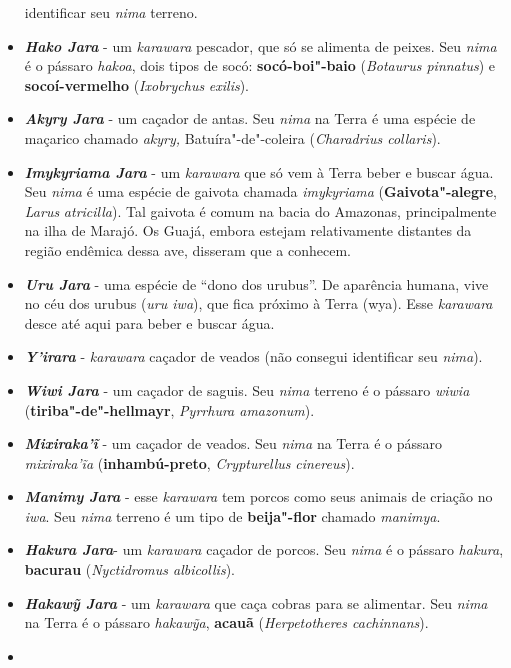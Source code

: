 \begin{itemize}
  identificar seu \emph{nima} terreno.
\item
  \textbf{\emph{Hako Jara}} - um \emph{karawara} pescador, que só se
  alimenta de peixes. Seu \emph{nima} é o pássaro \emph{hakoa}, dois
  tipos de socó: \textbf{socó-boi"-baio} (\emph{Botaurus pinnatus}) e
  \textbf{socoí-vermelho} (\emph{Ixobrychus} \emph{exilis}).
\item
  \textbf{\emph{Akyry Jara}} - um caçador de antas. Seu \emph{nima} na
  Terra é uma espécie de maçarico chamado \emph{akyry,}
  Batuíra"-de"-coleira (\emph{Charadrius collaris}).
\item
  \emph{\textbf{Imykyriama Jara}} - um \emph{karawara} que só vem à
  Terra beber e buscar água. Seu \emph{nima} é uma espécie de gaivota
  chamada \emph{imykyriama} (\textbf{Gaivota"-alegre}, \emph{Larus}
  \emph{atricilla}). Tal gaivota é comum na bacia do Amazonas,
  principalmente na ilha de Marajó. Os Guajá, embora estejam
  relativamente distantes da região endêmica dessa ave, disseram que a
  conhecem.
\item
  \emph{\textbf{Uru Jara}} - uma espécie de ``dono dos urubus''. De
  aparência humana, vive no céu dos urubus (\emph{uru iwa}), que fica
  próximo à Terra (wya). Esse \emph{karawara} desce até aqui para beber
  e buscar água.
\item
  \emph{\textbf{Y'irara}} - \emph{karawara} caçador de veados (não
  consegui identificar seu \emph{nima}).
\item
  \emph{\textbf{Wiwi Jara}} - um caçador de saguis. Seu \emph{nima}
  terreno é o pássaro \emph{wiwia} (\textbf{tiriba"-de"-hellmayr},
  \emph{Pyrrhura amazonum}).
\item
  \emph{\textbf{Mixiraka'ĩ}} - um caçador de veados. Seu \emph{nima} na
  Terra é o pássaro \emph{mixiraka'ĩa} (\textbf{inhambú-preto},
  \emph{Crypturellus} \emph{cinereus}).
\item
  \emph{\textbf{Manimy Jara}} - esse \emph{karawara} tem porcos como
  seus animais de criação no \emph{iwa}. Seu \emph{nima} terreno é um
  tipo de \textbf{beija"-flor} chamado \emph{manimya}.
\item
  \emph{\textbf{Hakura Jara}}- um \emph{karawara} caçador de porcos. Seu
  \emph{nima} é o pássaro \emph{hakura}, \textbf{bacurau}
  (\emph{Nyctidromus albicollis}).
\item
  \emph{\textbf{Hakawỹ Jara}} - um \emph{karawara} que caça cobras para
  se alimentar. Seu \emph{nima} na Terra é o pássaro \emph{hakawỹa},
  \textbf{acauã} (\emph{Herpetotheres cachinnans}).
\item

\end{itemize}
